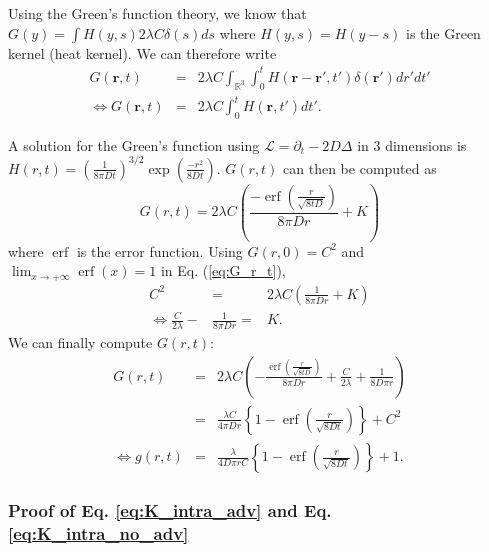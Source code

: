 \documentclass[english]{article}
\DeclareMathOperator\erf{erf}
\begin{document}
Using the Green's function theory, we know that $G(y)=\int H(y,s)2\lambda C\delta(s)ds$
where $H(y,s)=H(y-s)$ is the Green kernel (heat kernel). We can therefore
write
\begin{equation}
\begin{array}{ccc}
G(\boldsymbol{r},t) & = & 2\lambda C\int_{\mathbb{R}^{3}}\int_{0}^{t}H(\boldsymbol{r}-\boldsymbol{r'},t')\delta(\boldsymbol{r'})dr'dt'\\
\Leftrightarrow G(\boldsymbol{r},t) & = & 2\lambda C\int_{0}^{t}H(\boldsymbol{r},t')dt'.
\end{array}
\end{equation}

A solution for the Green's function using $\mathcal{L}=\partial_{t}-2D\Delta$
in 3 dimensions is $H(r,t)=\left(\frac{1}{8\pi Dt}\right)^{3/2}\exp(\frac{-r^{2}}{8Dt})$. $G(r,t)$ can then be computed as
\begin{equation}
G(r,t)=2\lambda C\left(\frac{-\erf\left(\frac{r}{\sqrt{8tD}}\right)}{8\pi Dr}+K\right)\label{eq:G_r_t}
\end{equation}
where $\erf$ is the error function. Using $G(r,0)=C^{2}$ and $\lim_{x\rightarrow+\infty}\erf(x)=1$
in Eq. (\ref{eq:G_r_t}),
\begin{equation}
\begin{array}{ccc}
C^{2} & = & 2\lambda C\left(\frac{1}{8\pi Dr}+K\right)\\
\Leftrightarrow\frac{C}{2\lambda}- & \frac{1}{8\pi Dr}= & K.
\end{array}
\end{equation}
We can finally compute $G(r,t)$:
\begin{equation}
\begin{array}{ccc}
G(r,t) & = & 2\lambda C\left(-\frac{\erf\left(\frac{r}{\sqrt{8tD}}\right)}{8\pi Dr}+\frac{C}{2\lambda}+\frac{1}{8D\pi r}\right)\\
 & = & \frac{\lambda C}{4\pi Dr}\left\{ 1-\erf\left(\frac{r}{\sqrt{8Dt}}\right)\right\} +C^{2}\\
\Leftrightarrow g(r,t) & = & \frac{\lambda}{4D\pi rC}\left\{ 1-\erf\left(\frac{r}{\sqrt{8Dt}}\right)\right\} +1.
\end{array}\label{eq:pcf_noadv_bbm}
\end{equation}

\subsubsection*{Proof of Eq. \ref{eq:K_intra_adv} and Eq. \ref{eq:K_intra_no_adv}}
\end{document}
